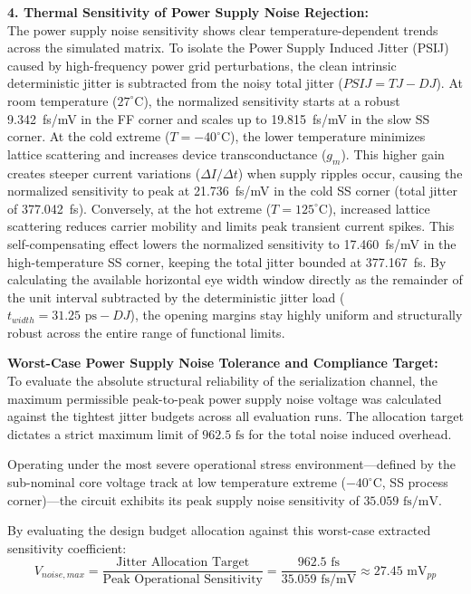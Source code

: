 \textbf{4. Thermal Sensitivity of Power Supply Noise Rejection:} \\
The power supply noise sensitivity shows clear temperature-dependent trends across the simulated matrix. To isolate the Power Supply Induced Jitter (PSIJ) caused by high-frequency power grid perturbations, the clean intrinsic deterministic jitter is subtracted from the noisy total jitter ($PSIJ = TJ - DJ$). At room temperature ($27^{\circ}\text{C}$), the normalized sensitivity starts at a robust 9.342~fs/mV in the FF corner and scales up to 19.815~fs/mV in the slow SS corner. At the cold extreme ($T = -40^{\circ}\text{C}$), the lower temperature minimizes lattice scattering and increases device transconductance ($g_m$). This higher gain creates steeper current variations ($\Delta I/\Delta t$) when supply ripples occur, causing the normalized sensitivity to peak at 21.736~fs/mV in the cold SS corner (total jitter of 377.042~fs). Conversely, at the hot extreme ($T = 125^{\circ}\text{C}$), increased lattice scattering reduces carrier mobility and limits peak transient current spikes. This self-compensating effect lowers the normalized sensitivity to 17.460~fs/mV in the high-temperature SS corner, keeping the total jitter bounded at 377.167~fs. By calculating the available horizontal eye width window directly as the remainder of the unit interval subtracted by the deterministic jitter load ($t_{width} = 31.25\text{ ps} - DJ$), the opening margins stay highly uniform and structurally robust across the entire range of functional limits.

\textbf{ Worst-Case Power Supply Noise Tolerance and Compliance Target:} \\
To evaluate the absolute structural reliability of the serialization channel, the maximum permissible peak-to-peak power supply noise voltage was calculated against the tightest jitter budgets across all evaluation runs. The allocation target dictates a strict maximum limit of $962.5\text{ fs}$ for the total noise induced overhead. 

Operating under the most severe operational stress environment—defined by the sub-nominal core voltage track at low temperature extreme ($-40^\circ\text{C}$, SS process corner)—the circuit exhibits its peak supply noise sensitivity of $35.059\text{ fs/mV}$. 

By evaluating the design budget allocation against this worst-case extracted sensitivity coefficient:
$$V_{noise,max} = \frac{\text{Jitter Allocation Target}}{\text{Peak Operational Sensitivity}} = \frac{962.5\text{ fs}}{35.059\text{ fs/mV}} \approx 27.45\text{ mV}_{pp}$$

